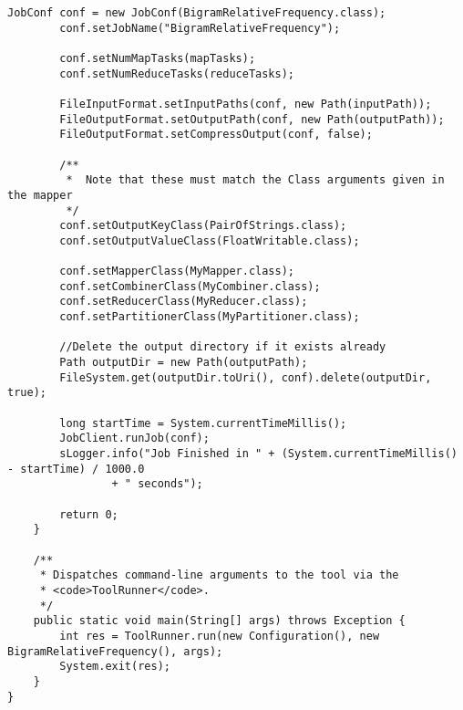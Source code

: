 \documentclass{article} %
\begin{document}
\begin{lstlisting}[style=Java]
		JobConf conf = new JobConf(BigramRelativeFrequency.class);
		conf.setJobName("BigramRelativeFrequency");

		conf.setNumMapTasks(mapTasks);
		conf.setNumReduceTasks(reduceTasks);

		FileInputFormat.setInputPaths(conf, new Path(inputPath));
		FileOutputFormat.setOutputPath(conf, new Path(outputPath));
		FileOutputFormat.setCompressOutput(conf, false);

		/**
		 *  Note that these must match the Class arguments given in the mapper 
		 */
		conf.setOutputKeyClass(PairOfStrings.class);
		conf.setOutputValueClass(FloatWritable.class);

		conf.setMapperClass(MyMapper.class);
		conf.setCombinerClass(MyCombiner.class);
		conf.setReducerClass(MyReducer.class);
		conf.setPartitionerClass(MyPartitioner.class);

		//Delete the output directory if it exists already
		Path outputDir = new Path(outputPath);
		FileSystem.get(outputDir.toUri(), conf).delete(outputDir, true);

		long startTime = System.currentTimeMillis();
		JobClient.runJob(conf);
		sLogger.info("Job Finished in " + (System.currentTimeMillis() - startTime) / 1000.0
				+ " seconds");

		return 0;
	}

	/**
	 * Dispatches command-line arguments to the tool via the
	 * <code>ToolRunner</code>.
	 */
	public static void main(String[] args) throws Exception {
		int res = ToolRunner.run(new Configuration(), new BigramRelativeFrequency(), args);
		System.exit(res);
	}
}
\end{lstlisting}
\end{document}
